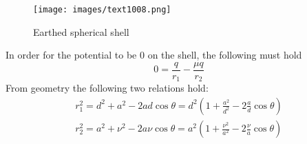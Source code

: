 \begin{figure}
    \centering
    \texttt{[image: images/text1008.png]}
    \caption{Earthed spherical shell}
\end{figure}

\noindent In order for the potential to be 0 on the shell, the following must hold
\begin{equation}
    0 = \frac{q}{r_1} - \frac{\mu q}{r_2}
\end{equation}
From geometry the following two relations hold:
\begin{equation}
    \begin{array}{l}
    r_{1}^{2}=d^{2}+a^{2}-2 a d \cos \theta=d^{2}\left(1+\frac{a^{2}}{d^{2}}-2 \frac{a}{d} \cos \theta\right) \\
    r_{2}^{2}=a^{2}+\nu^{2}-2 a \nu \cos \theta=a^{2}\left(1+\frac{\nu^{2}}{a^{2}}-2 \frac{\nu}{a} \cos \theta\right)
    \end{array}
\end{equation}


